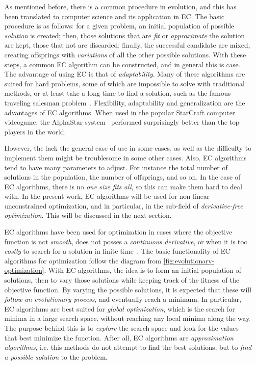 As mentioned before, there is a common procedure in evolution, and this has been translated 
to computer science and its application in EC. The basic procedure is as follows: for a 
given problem, an initial population of possible \emph{solution} is created; then, those 
solutions that are \emph{fit} or \emph{approximate} the solution are kept, those that not 
are discarded; finally, the successful candidate are mixed, creating offsprings with 
\emph{variations} of all the other possible solutions. With these steps, a common EC 
algorithm can be constructed, and in general this is case. The advantage of using EC is 
that of \emph{adaptability}. Many of these algorithms are suited for hard problems, some of 
which are impossible to solve with traditional methods, or at least take a long time to 
find a solution, such as the famous traveling salesman 
problem~\cite{dorigoAntColonySystem1997}. Flexibility, adaptability and generalization are 
the advantages of EC algorithms. When used in the popular StarCraft computer videogame, the 
AlphaStar system~\cite{arulkumaranAlphaStarEvolutionaryComputation2019} performed 
surprisingly better than the top players in the world.

However, the lack the general ease of use in some cases, as well as the difficulty to 
implement them might be troublesome in some other cases. Also, EC algorithms tend to have 
many parameters to adjust. For instance the total number of solutions in the population, 
the number of offsprings, and so on. In the case of EC algorithms, there is no \emph{one 
size fits all}, so this can make them hard to deal with. In the present work, EC algorithms 
will be used for non-linear unconstrained optimization, and in particular, in the sub-field 
of \emph{derivative-free optimization}. This will be discussed in the next section.

EC algorithms have been used for optimization in cases where the objective function is not 
\emph{smooth}, does not posses a \emph{continuous derivative}, or when it is too 
\emph{costly} to search for a solution in finite 
time~\cite{kacprzykSpringerHandbookComputational2015}. The basic functionality of EC 
algorithms for optimization follow the diagram from 
\autoref{fig:evolutionary-optimization}. With EC algorithms, the idea is to form an initial 
population of solutions, then to vary those solutions while keeping track of the fitness of 
the objective function. By varying the possible solutions, it is expected that these will 
\emph{follow an evolutionary process}, and eventually reach a minimum. In particular, EC 
algorithms are best suited for \emph{global optimization}, which is the search for minima 
in a large search space, without reaching any local minima along the way. The purpose 
behind this is to \emph{explore} the search space and look for the values that best 
minimize the function. After all, EC algorithms are \emph{approximation algorithms}, i.e. 
this methods do not attempt to find the best solutions, but to 
\emph{find a possible solution} to the problem.

